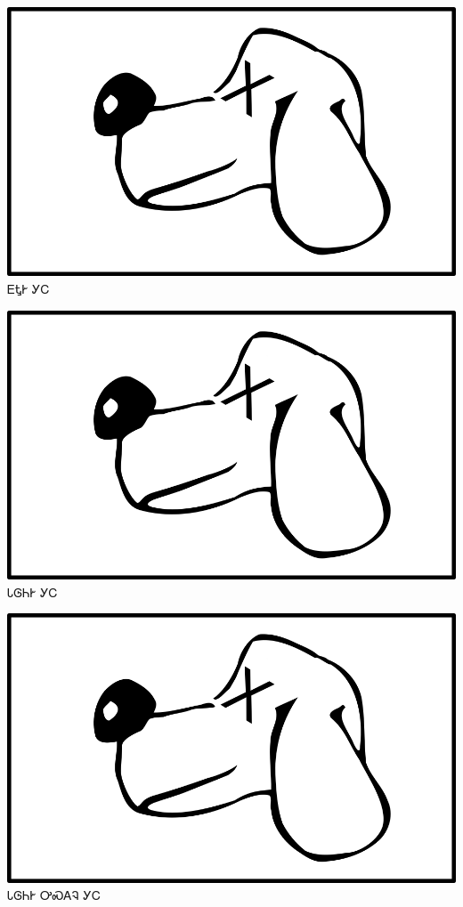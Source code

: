 \documentclass[avery5371]{flashcards}%
\begin{document}
\begin{flashcard}{
\includegraphics[width=0.95\columnwidth,height=.51\columnwidth,keepaspectratio]{../artwork/for-colors/gihli-dead}
}
\Huge ᎬᎿᎨ ᎩᏟ
\end{flashcard}

\begin{flashcard}{
\includegraphics[width=0.95\columnwidth,height=.51\columnwidth,keepaspectratio]{../artwork/for-colors/gihli-dead}
}
\Huge ᏓᎶᏂᎨ ᎩᏟ
\end{flashcard}

\begin{flashcard}{
\includegraphics[width=0.95\columnwidth,height=.51\columnwidth,keepaspectratio]{../artwork/for-colors/gihli-dead}
}
\Huge ᏓᎶᏂᎨ ᎤᏍᎪᎸ ᎩᏟ
\end{flashcard}
\end{document}
